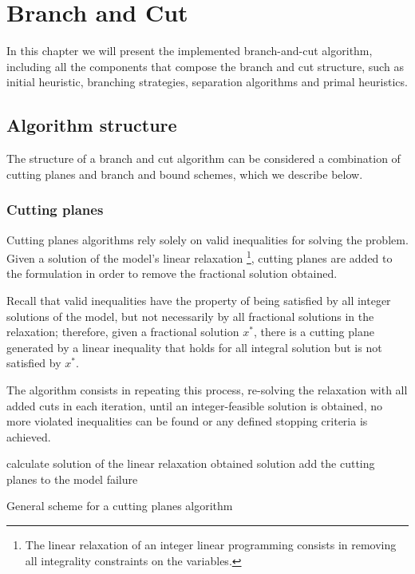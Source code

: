 
\chapter{Branch and Cut}
\label{sec:bnc}

In this chapter we will present the implemented branch-and-cut algorithm, including all the components that compose the branch and cut structure, such as initial heuristic, branching strategies, separation algorithms and primal heuristics.

\section{Algorithm structure}

The structure of a branch and cut algorithm can be considered a combination of cutting planes and branch and bound schemes, which we describe below.

\subsection{Cutting planes}

Cutting planes algorithms rely solely on valid inequalities for solving the problem. Given a solution of the model's linear relaxation \footnote{The linear relaxation of an integer linear programming consists in removing all integrality constraints on the variables.}, cutting planes are added to the formulation in order to remove the fractional solution obtained. 

Recall that valid inequalities have the property of being satisfied by all integer solutions of the model, but not necessarily by all fractional solutions in the relaxation; therefore, given a fractional solution $x^*$, there is a cutting plane generated by a linear inequality that holds for all integral solution but is not satisfied by $x^*$. 

The algorithm consists in repeating this process, re-solving the relaxation with all added cuts in each iteration, until an integer-feasible solution is obtained, no more violated inequalities can be found or any defined stopping criteria is achieved.

\begin{algorithm}

\begin{algorithmic}

\LOOP
	\STATE calculate solution of the linear relaxation
		\RETURN obtained solution
		\STATE add the cutting planes to the model
	\ELSE
		\RETURN failure
	\ENDIF	
\ENDLOOP

\caption{General scheme for a cutting planes algorithm}
\label{alg:cuttingplanes}

\end{algorithmic}
\end{algorithm}

